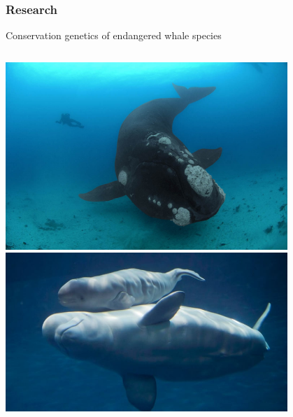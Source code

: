 \documentclass[10pt]{beamer}
\begin{document}
\begin{frame}[t]
\frametitle{Research}

	\begin{center}
		Conservation genetics of endangered whale species
	\end{center}

	\begin{columns}[t]
		\begin{column}{0.5\textwidth}
			\begin{center}
				\includegraphics[width=0.8\textwidth]{figures/rightwhale.jpg}\\
				\vspace{0.25cm}
				\includegraphics[width=0.8\textwidth]{figures/beluga.jpg}
			\end{center}
		\end{column}
		

\end{columns}
\end{frame}
\end{document}
